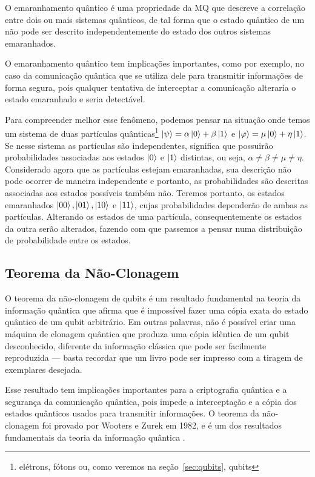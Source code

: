 O emaranhamento quântico é uma propriedade da MQ que descreve a correlação entre dois ou mais sistemas quânticos, de tal forma que o estado quântico de um  não pode ser descrito independentemente do estado dos outros sistemas emaranhados.

O emaranhamento quântico tem implicações importantes, como por exemplo, no caso da comunicação quântica que se utiliza dele para transmitir informações de forma segura, pois qualquer tentativa de interceptar a comunicação alteraria o estado emaranhado e seria detectável.

Para compreender melhor esse fenômeno, podemos pensar na situação onde temos um sistema de duas partículas quânticas\footnote{elétrons, fótons ou, como veremos na seção~\ref{sec:qubits}, qubits} $\ket{\psi}=\alpha\ket{0}+\beta\ket{1}$ e $\ket{\varphi}=\mu\ket{0}+\eta\ket{1}$. Se nesse sistema as partículas são independentes, significa que possuirão probabilidades associadas aos estados $\ket{0}$ e $\ket{1}$ distintas, ou seja, $\alpha \neq \beta \neq \mu \neq \eta$. Considerado agora que as partículas estejam emaranhadas, sua descrição não pode ocorrer de maneira independente e portanto, as probabilidades são descritas associadas aos estados possíveis também não. Teremos portanto, os estados emaranhados $\ket{00}, \ket{01}, \ket{10}$ e $\ket{11}$, cujas probabilidades dependerão de ambas as partículas. Alterando os estados de uma partícula, consequentemente os estados da outra serão alterados, fazendo com que passemos a pensar numa distribuição de probabilidade entre os estados. 


\subsection{Teorema da Não-Clonagem}\label{sec:naoclonagem}

O teorema da não-clonagem de qubits é um resultado fundamental na teoria da informação quântica que afirma que é impossível fazer uma cópia exata do estado quântico de um qubit arbitrário. Em outras palavras, não é possível criar uma máquina de clonagem quântica que produza uma cópia idêntica de um qubit desconhecido, diferente da informação clássica que pode ser facilmente reproduzida --- basta recordar que um livro pode ser impresso com a tiragem de exemplares desejada.

Esse resultado tem implicações importantes para a criptografia quântica e a segurança da comunicação quântica, pois impede a interceptação e a cópia dos estados quânticos usados para transmitir informações. O teorema da não-clonagem foi provado por Wooters e Zurek em 1982, e é um dos resultados fundamentais da teoria da informação quântica \cite{clone}.


